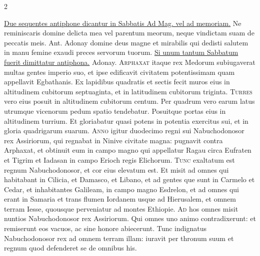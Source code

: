 \begin{multicols*}{2}
\begin{responsory-doxology}
\end{responsory-doxology}%
\newline \ul{Due sequentes antiphone dicantur in Sabbatis Ad Mag. vel ad memoriam.}
 Ne reminiscaris domine delicta mea vel parentum meorum, neque vindictam suam de peccatis meis. {\color{Red} Ant.} Adonay domine deus magne et mirabilis qui dedisti salutem in manu femine exaudi preces servorum tuorum.
\newline \ul{Si unum tantum Sabbatum fuerit dimittatur antiphona.} Adonay.
\lettrine[lines=2]{\zallmancaps \color{Blue} A}{rphaxat} itaque rex Medorum subiugaverat multas gentes imperio suo, et ipse edificavit civitatem potentissimam quam appellavit Egbathanis. Ex lapidibus quadratis et sectis fecit muros eius in altitudinem cubitorum septuaginta, et in latitudinem cubitorum triginta.
\lettrine[lines=2]{\zallmancaps \color{Red} T}{urres} vero eius posuit in altitudinem cubitorum centum. Per quadrum vero earum latus utrumque vicenorum pedum spatio tendebatur. Posuitque portas eius in altitudinem turrium. Et gloriabatur quasi potens in potentia exercitus sui, et in gloria quadrigarum suarum.
\lettrine[lines=2]{\zallmancaps \color{Blue} A}{nno} igitur duodecimo regni sui Nabuchodonosor rex Assiriorum, qui regnabat in Ninive civitate magna: pugnavit contra Arphaxat, et obtinuit eum in campo magno qui appellatur Ragau circa Eufraten et Tigrim et Iadasan in campo Erioch regis Elichorum.
\lettrine[lines=2]{\zallmancaps \color{Red} T}{unc} exaltatum est regnum Nabuchodonosor, et cor eius elevatum est. Et misit ad omnes qui habitabant in Cilicia, et Damasco, et Libano, et ad gentes que sunt in Carmelo et Cedar, et inhabitantes Galileam, in campo magno Esdrelon, et ad omnes qui erant in Samaria et trans flumen Iordanem usque ad Hierusalem, et omnem terram Iesse, quousque perveniatur ad montes Ethiopie.
\lettrine[lines=2]{\zallmancaps \color{Blue} A}{d} hos omnes misit nuntios Nabuchodonosor rex Assiriorum. Qui omnes uno animo contradixerunt: et remiserunt eos vacuos, ac sine honore abiecerunt. Tunc indignatus Nabuchodonosor rex ad omnem terram illam: iuravit per thronum suum et regnum quod defenderet se de omnibus his.

\end{multicols*}
